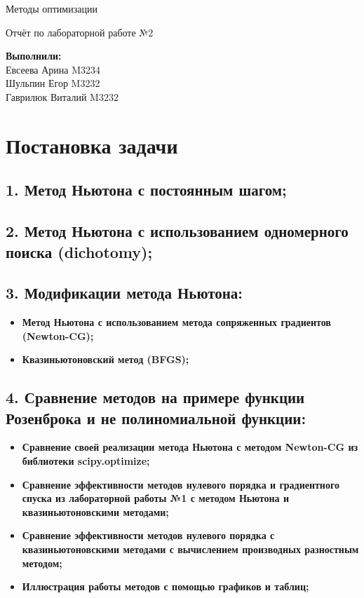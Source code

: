 \documentclass{article}
\begin{document}
\begin{titlepage}
    \bfseries 
        {\centering
            \vspace*{14em}
            \Huge Методы оптимизации\par
            \bigbreak
            Отчёт по лабораторной работе №2 \par
        }
    \vspace{20em}
    \begin{spacing}{2}
        \begin{flushright}
            {\Large \textbf{Выполнили:}}  \\
            {\large Евсеева Арина M3234} \\
            {\large Шульпин Егор M3232} \\
            {\large Гаврилюк Виталий M3232} \\ 
        \end{flushright}
    \end{spacing}
\end{titlepage}

\newpage
\section*{Постановка задачи}
\subsection*{1. Метод Ньютона с постоянным шагом;}
\subsection*{2. Метод Ньютона с использованием одномерного поиска (dichotomy);}
\subsection*{3. Модификации метода Ньютона:}
\begin{itemize}
    \item \textbf{Метод Ньютона с использованием метода сопряженных градиентов (Newton-CG);}
    \item \textbf{Квазиньютоновский метод (BFGS);}
\end{itemize}
\subsection*{4. Сравнение методов на примере функции Розенброка и не полиномиальной функции:}
\begin{itemize}
    \item \textbf{Сравнение своей реализации метода Ньютона с методом Newton-CG из библиотеки scipy.optimize;}
    \item \textbf{Сравнение эффективности методов нулевого порядка и градиентного спуска из лабораторной работы №1 с методом Ньютона и квазиньютоновскими методами;}
    \item \textbf{Сравнение эффективности методов нулевого порядка с квазиньютоновскими методами с вычислением производных разностным методом;}
    \item \textbf{Иллюстрация работы методов с помощью графиков и таблиц;}
\end{itemize}
\end{document}
